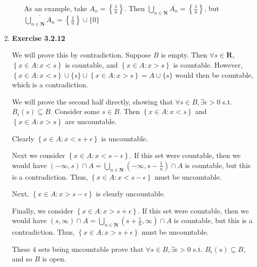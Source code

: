 \documentclass{article}
\begin{document}
\begin{enumerate}
\begin{enumerate}
        \smallskip

        As an example, take $A_n = \left\{\frac{1}{n}\right\}$. Then $\bigcup_{n \in \mathbf{N}} \overline{A_n} = \left\{ \frac{1}{n}\right\}$, but $\overline{\bigcup_{n \in \mathbf{N}} A_n} = \left\{\frac{1}{n}\right\} \cup \{0\}$
    \end{enumerate}

    \item \textbf{Exercise 3.2.12}

     We will prove this by contradiction. Suppose $B$ is empty. Then $\forall s \in \mathbf{R}$, $\left\{x \in A : x < s \right\}$ is countable, and $\left\{x \in A : x > s \right\}$ is countable. However, $\left\{x \in A : x < s \right\} \cup \{s\} \cup \left\{x \in A : x > s \right\} = A \cup \{s\}$ would then be countable, which is a contradiction. 

     \smallskip

     We will prove the second half directly, showing that $\forall s \in B, \exists\epsilon>0$ s.t. $B_\epsilon(s) \subseteq B$. Consider some $s \in B$. Then $\left\{x \in A : x < s\right\}$ and $\left\{ x \in A : x > s\right\}$ are uncountable.
     
     \smallskip 
     
     Clearly $\left\{x \in A : x < s + \epsilon \right\}$ is uncountable. 
     
     \smallskip
     
     Next we consider $\left\{x\in A : x < s - \epsilon\right\}$. If this set were countable, then we would have $(-\infty, s) \cap A = \bigcup_{n\in \mathbf{N}} (-\infty, s - \frac{1}{n}) \cap A$ is countable, but this is a contradiction. Thus, $\left\{x\in A : x < s - \epsilon\right\}$ must be uncountable. 

     \smallskip

     Next, $\left\{x \in A : x > s - \epsilon\right\}$ is clearly uncountable.

     \smallskip

     Finally, we consider $\left\{x \in A : x > s + \epsilon\right\}$. If this set were countable, then we would have $(s, \infty) \cap A = \bigcup_{n \in \mathbf{N}} (s + \frac{1}{n}, \infty) \cap A$ is countable, but this is a contradiction. Thus, $\left\{x \in A : x > s + \epsilon\right\}$ must be uncountable. 

     \smallskip

     These 4 sets being uncountable prove that $\forall s\in B,  \exists \epsilon > 0$ s.t. $B_\epsilon(s) \subseteq B$, and so $B$ is open.  


\end{enumerate}
\end{document}
